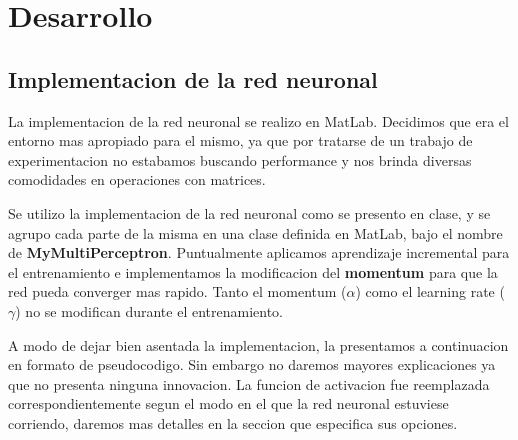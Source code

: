 \documentclass[informe.tex]{subfiles}
\begin{document}
  
  \section{Desarrollo}
  
  \subsection{Implementacion de la red neuronal}
    La implementacion de la red neuronal se realizo en MatLab. Decidimos que era el entorno mas apropiado para el mismo, ya que por tratarse de un trabajo de experimentacion no estabamos buscando performance y nos brinda diversas comodidades en operaciones con matrices. 
    
    Se utilizo la implementacion de la red neuronal como se presento en clase, y se agrupo cada parte de la misma en una clase definida en MatLab, bajo el nombre de \textbf{MyMultiPerceptron}. Puntualmente aplicamos aprendizaje incremental para el entrenamiento e implementamos la modificacion del \textbf{momentum} para que la red pueda converger mas rapido. Tanto el momentum ($\alpha$) como el learning rate ($\gamma$) no se modifican durante el entrenamiento. 
    
    A modo de dejar bien asentada la implementacion, la presentamos a continuacion en formato de pseudocodigo. Sin embargo no daremos mayores explicaciones ya que no presenta ninguna innovacion. La funcion de activacion fue reemplazada correspondientemente segun el modo en el que la red neuronal estuviese corriendo, daremos mas detalles en la seccion que especifica sus opciones.
  
    \vspace{15pt}
    
\end{document}
